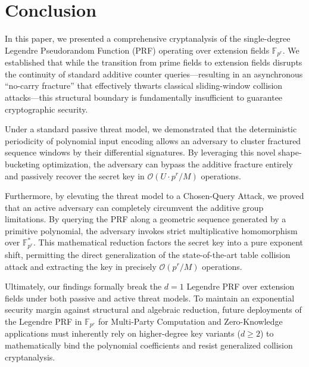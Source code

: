 \documentclass[runningheads]{llncs}
\begin{document}
\section{Conclusion}
In this paper, we presented a comprehensive cryptanalysis of the single-degree Legendre Pseudorandom Function (PRF) operating over extension fields $\mathbb{F}_{p^r}$. We established that while the transition from prime fields to extension fields disrupts the continuity of standard additive counter queries—resulting in an asynchronous \enquote{no-carry fracture} that effectively thwarts classical sliding-window collision attacks—this structural boundary is fundamentally insufficient to guarantee cryptographic security.

Under a standard passive threat model, we demonstrated that the deterministic periodicity of polynomial input encoding allows an adversary to cluster fractured sequence windows by their differential signatures. By leveraging this novel shape-bucketing optimization, the adversary can bypass the additive fracture entirely and passively recover the secret key in $\mathcal{O}(U \cdot p^r/M)$ operations.

Furthermore, by elevating the threat model to a Chosen-Query Attack, we proved that an active adversary can completely circumvent the additive group limitations. By querying the PRF along a geometric sequence generated by a primitive polynomial, the adversary invokes strict multiplicative homomorphism over $\mathbb{F}_{p^r}^*$. This mathematical reduction factors the secret key into a pure exponent shift, permitting the direct generalization of the state-of-the-art table collision attack \cite{beullens2019} and extracting the key in precisely $\mathcal{O}(p^r/M)$ operations.

Ultimately, our findings formally break the $d=1$ Legendre PRF over extension fields under both passive and active threat models. To maintain an exponential security margin against structural and algebraic reduction, future deployments of the Legendre PRF in $\mathbb{F}_{p^r}$ for Multi-Party Computation and Zero-Knowledge applications must inherently rely on higher-degree key variants ($d \geq 2$) to mathematically bind the polynomial coefficients and resist generalized collision cryptanalysis.
\end{document}
